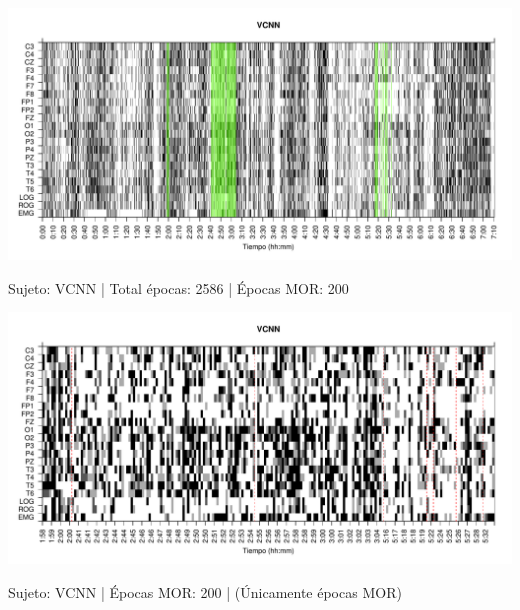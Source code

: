 \begin{SidewaysFigure}
\centering
\includegraphics[width=\linewidth]
{./material_bonito170220/VCNNS1_200_mor200_tot2584_est_total.pdf} 
\caption{Sujeto: VCNN | Total \'epocas: 2586 | \'Epocas MOR: 200}
\end{SidewaysFigure}
\begin{SidewaysFigure}
\centering
\includegraphics[width=\linewidth]
{./material_bonito170220/VCNNS1_200_mor200_tot200_est_mor.pdf} 
\caption{Sujeto: VCNN | \'Epocas MOR: 200 | (\'Unicamente \'epocas MOR)}
\end{SidewaysFigure}


